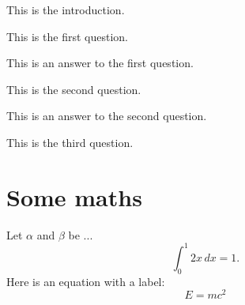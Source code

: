 \documentclass{camel}
\begin{document}
\begin{exercise}\label{ex:demo}
This is the introduction.
\begin{questions} 
\question This is the first question.\label{qu:first-question}
\begin{answer} 
This is an answer to the first question.
\end{answer} 
\question This is the second question.\label{qu:second-question}
\begin{answer} 
This is an answer to the second question.
\end{answer} 
\question This is the third question.\label{qu:third-question}
\end{questions} 
\end{exercise}

\chapter{Some maths}
Let $\alpha$ and $\beta$ be ...
\[
\int_0^1 2x\,dx = 1. 
\]
Here is an equation with a label:
\begin{equation}\label{eq:einstein}
E = mc^2
\end{equation}
\end{document}
